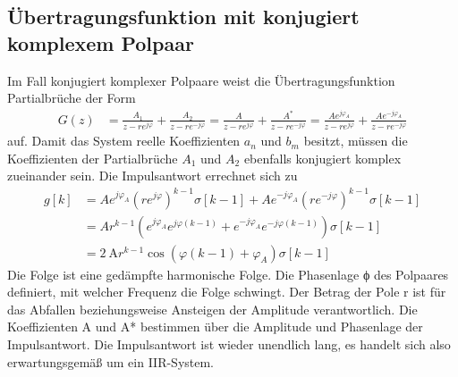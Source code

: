 \subsection{Übertragungsfunktion mit konjugiert komplexem Polpaar}\label{sec:uxfcbertragungsfunktion-mit-konjugiert-komplexem-polpaar}

Im Fall konjugiert komplexer Polpaare weist die Übertragungsfunktion Partialbrüche der Form
\begin{align}
G(z) &= \frac{A_{1}}{z - r  e^{j  \varphi}} + \frac{A_{2}}{z - r  e^{- j  \varphi}} = \frac{A}{z - r  e^{j  \varphi}} + \frac{A^{*}}{z - r  e^{- j  \varphi}} = \frac{A  e^{j  \varphi_{A}}}{z - r  e^{j  \varphi}} + \frac{A  e^{- j  \varphi_{A}}}{z - r  e^{- j  \varphi}} \label{eq:6.104}
\end{align}
auf. Damit das System reelle Koeffizienten \(a_{n}\) und \(b_{m}\) besitzt, müssen die Koeffizienten der Partialbrüche \(A_{1}\) und \(A_{2}\) ebenfalls konjugiert komplex zueinander sein. Die Impulsantwort errechnet sich zu
\begin{align}
{g\left[k\right]} &=  {A e^{j \varphi _{A} }  \left(r e^{j \varphi } \right)^{k-1}  \sigma \left[k-1\right]+A e^{-j \varphi _{A} }  \left(r e^{-j \varphi } \right)^{k-1}  \sigma \left[k-1\right]} \\
{} &=  {A r^{k-1} \left(e^{j \varphi _{A} }  e^{j \varphi  \left(k-1\right)} +e^{-j \varphi _{A} }  e^{-j \varphi  \left(k-1\right)} \right) \sigma \left[k-1\right]} \\
{} &=  {\qty{2}{\ampere} r^{k-1}  \cos \left(\varphi  \left(k-1\right)+\varphi _{A} \right) \sigma \left[k-1\right]}
\label{eq:6.105}
\end{align}
Die Folge ist eine gedämpfte harmonische Folge. Die Phasenlage ϕ des Polpaares definiert, mit welcher Frequenz die Folge schwingt. Der Betrag der Pole r ist für das Abfallen beziehungsweise Ansteigen der Amplitude verantwortlich. Die Koeffizienten A und A* bestimmen über die Amplitude und Phasenlage der Impulsantwort. Die Impulsantwort ist wieder unendlich lang, es handelt sich also erwartungsgemäß um ein IIR-System.

